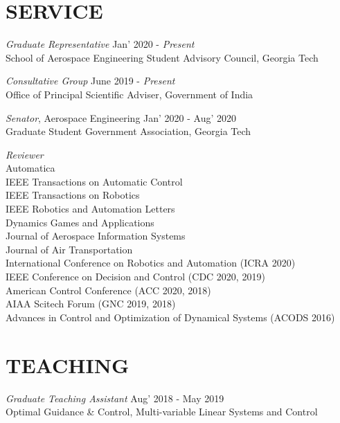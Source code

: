 \documentclass[margin, 10pt]{res} %
\begin{document}
\begin{resume}

\section{SERVICE}

{\sl Graduate Representative} \hfill Jan' 2020 - \emph{Present}\\
School of Aerospace Engineering Student Advisory Council, Georgia Tech

{\sl Consultative Group} \hfill June 2019 - \emph{Present}\\
Office of Principal Scientific Adviser, Government of India

{\sl Senator}, Aerospace Engineering \hfill Jan' 2020 - Aug' 2020\\
Graduate Student Government Association, Georgia Tech

{\sl Reviewer}\\
Automatica\\
IEEE Transactions on Automatic Control\\
IEEE Transactions on Robotics\\
IEEE Robotics and Automation Letters\\
Dynamics Games and Applications\\
Journal of Aerospace Information Systems\\
Journal of Air Transportation\\
International Conference on Robotics and Automation (ICRA 2020)\\
IEEE Conference on Decision and Control (CDC 2020, 2019)\\
American Control Conference (ACC 2020, 2018)\\
AIAA Scitech Forum (GNC 2019, 2018)\\
Advances in Control and Optimization of Dynamical Systems (ACODS 2016)


\section{TEACHING}

{\sl Graduate Teaching Assistant} \hfill Aug' 2018 - May 2019\\
Optimal Guidance \& Control, Multi-variable Linear Systems and Control


\end{resume}
\end{document}

